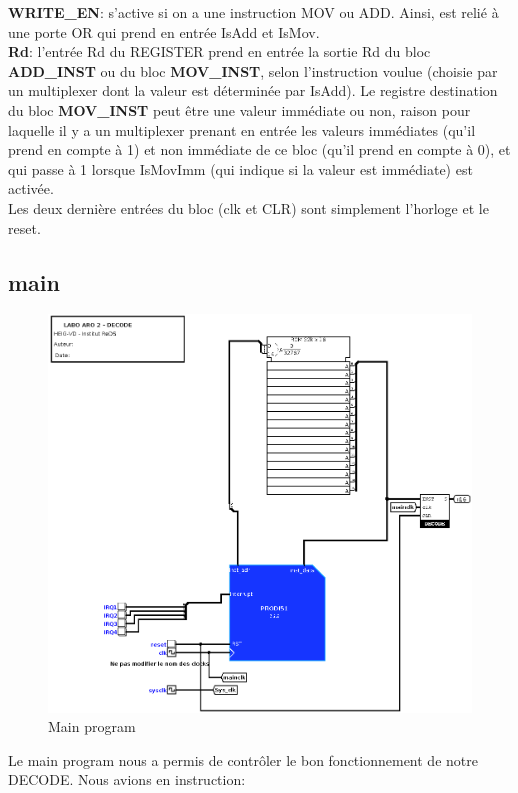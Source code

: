 \documentclass[a4paper]{article} %
\begin{document}
\textbf{WRITE\_EN}: s'active si on a une instruction MOV ou ADD. Ainsi, est relié à une porte OR qui prend en entrée IsAdd et IsMov.
\medskip \\
\textbf{Rd}: l'entrée Rd du REGISTER prend en entrée la sortie Rd du bloc \textbf{ADD\_INST} ou du bloc \textbf{MOV\_INST}, selon l'instruction voulue (choisie par un multiplexer dont la valeur est déterminée par IsAdd). Le registre destination du bloc \textbf{MOV\_INST} peut être une valeur immédiate ou non, raison pour laquelle il y a un multiplexer prenant en entrée les valeurs immédiates (qu'il prend en compte à 1) et non immédiate de ce bloc (qu'il prend en compte à 0), et qui passe à 1 lorsque IsMovImm (qui indique si la valeur est immédiate) est activée.
\medskip \\
Les deux dernière entrées du bloc (clk et CLR) sont simplement l'horloge et le reset.

\subsection{main}
\begin{figure}[H]
    \centering
    \includegraphics[width=1\textwidth]{src/main.png}
    \caption{Main program}
    \label{main_img}
\end{figure}

Le main program nous a permis de contrôler le bon fonctionnement de notre DECODE. Nous avions en instruction: \medskip
\end{document}
